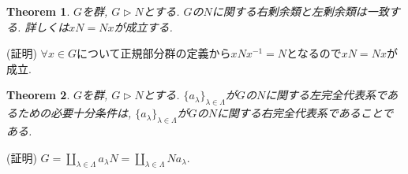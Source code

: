 \documentclass{article}
\theoremstyle{plain}
\newtheorem{theorem}{Theorem}
\theoremstyle{definition}
\theoremstyle{plain}
\numberwithin{equation}{section}
\numberwithin{theorem}{section}
\numberwithin{definition}{section}
\numberwithin{note}{section}
\begin{document}
\begin{theorem}
     $G$を群, $G\rhd N$とする. $G$の$N$に関する右剰余類と左剰余類は一致する. 
     詳しくは$xN=Nx$が成立する.
\end{theorem}
(証明) $\forall x\in G$について正規部分群の定義から$xNx^{-1}=N$となるので$xN=Nx$が成立.

\begin{theorem}
     $G$を群, $G\rhd N$とする. $\lbrace a_\lambda\rbrace_{\lambda\in \Lambda}$が$G$の$N$に関する左完全代表系であるための必要十分条件は, $\lbrace a_\lambda\rbrace_{\lambda\in \Lambda}$が$G$の$N$に関する右完全代表系であることである.
\end{theorem}
(証明) $G=\coprod_{\lambda\in \Lambda}a_\lambda N=\coprod_{\lambda\in \Lambda}N a_\lambda$.
\end{document}
